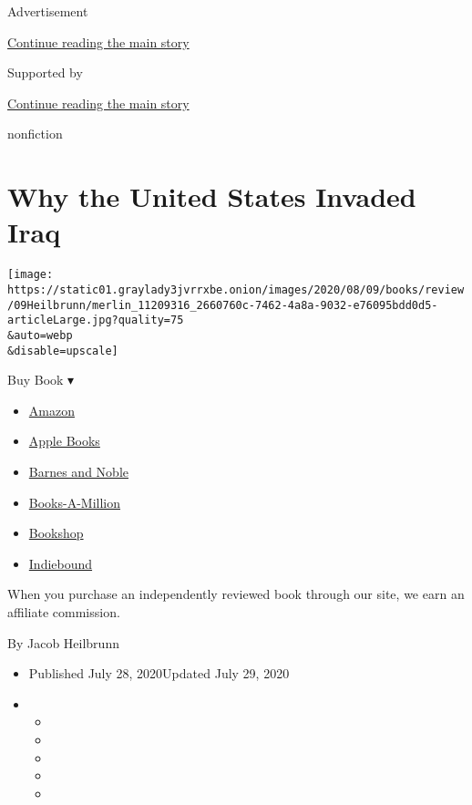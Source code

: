 Advertisement

\protect\hyperlink{after-top}{Continue reading the main story}

Supported by

\protect\hyperlink{after-sponsor}{Continue reading the main story}

nonfiction

\hypertarget{why-the-united-states-invaded-iraq}{%
\section{Why the United States Invaded
Iraq}\label{why-the-united-states-invaded-iraq}}

\texttt{[image: https://static01.graylady3jvrrxbe.onion/images/2020/08/09/books/review/09Heilbrunn/merlin\_11209316\_2660760c-7462-4a8a-9032-e76095bdd0d5-articleLarge.jpg?quality=75\\\&auto=webp\\\&disable=upscale]}

Buy Book ▾

\begin{itemize}
\tightlist
\item
  \href{https://www.amazon.com/gp/search?index=books\&tag=NYTBSREV-20\&field-keywords=To+Start+a+War+Robert+Draper}{Amazon}
\item
  \href{https://du-gae-books-dot-nyt-du-prd.appspot.com/buy?title=To+Start+a+War\&author=Robert+Draper}{Apple
  Books}
\item
  \href{https://www.anrdoezrs.net/click-7990613-11819508?url=https\%3A\%2F\%2Fwww.barnesandnoble.com\%2Fw\%2F\%3Fean\%3D9780525561040}{Barnes
  and Noble}
\item
  \href{https://www.anrdoezrs.net/click-7990613-35140?url=https\%3A\%2F\%2Fwww.booksamillion.com\%2Fp\%2FTo\%2BStart\%2Ba\%2BWar\%2FRobert\%2BDraper\%2F9780525561040}{Books-A-Million}
\item
  \href{https://bookshop.org/a/3546/9780525561040}{Bookshop}
\item
  \href{https://www.indiebound.org/book/9780525561040?aff=NYT}{Indiebound}
\end{itemize}

When you purchase an independently reviewed book through our site, we
earn an affiliate commission.

By Jacob Heilbrunn

\begin{itemize}
\item
  Published July 28, 2020Updated July 29, 2020
\item
  \begin{itemize}
  \item
  \item
  \item
  \item
  \item
  \end{itemize}
\end{itemize}

